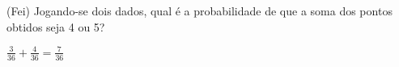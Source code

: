 \begin{ex}
(Fei) Jogando-se dois dados, qual é a probabilidade de que a soma dos pontos obtidos seja 4 ou 5?
  \begin{sol}
   $\frac{3}{36}+\frac{4}{36}=\frac{7}{36}$
  \end{sol}
\end{ex}